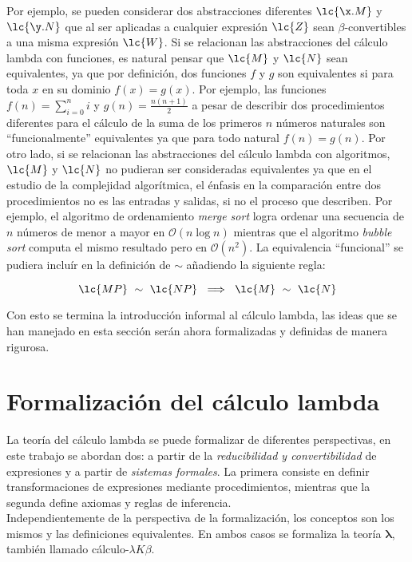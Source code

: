 Por ejemplo, se pueden considerar dos abstracciones diferentes \(\lc{\x.M}\) y
\(\lc{\y.N}\) que al ser aplicadas a cualquier expresión \(\lc{Z}\) sean
\(\beta\)-convertibles a una misma expresión \(\lc{W}\). Si se relacionan las
abstracciones del cálculo lambda con funciones, es natural pensar que \(\lc{M}\)
y \(\lc{N}\) sean equivalentes, ya que por definición, dos funciones \(f\) y
\(g\) son equivalentes si para toda \(x\) en su dominio \(f(x)=g(x)\). Por
ejemplo, las funciones \(f(n)=\sum_{i=0}^{n}i\) y \(g(n)=\frac{n(n+1)}{2}\) a
pesar de describir dos procedimientos diferentes para el cálculo de la suma de
los primeros \(n\) números naturales son ``funcionalmente'' equivalentes ya que
para todo natural \(f(n)=g(n)\). Por otro lado, si se relacionan las
abstracciones del cálculo lambda con algoritmos, \(\lc{M}\) y \(\lc{N}\) no
pudieran ser consideradas equivalentes ya que en el estudio de la complejidad
algorítmica, el énfasis en la comparación entre dos procedimientos no es las
entradas y salidas, si no el proceso que describen. Por ejemplo, el algoritmo de
ordenamiento \emph{merge sort} logra ordenar una secuencia de \(n\) números de
menor a mayor en \(\mathcal{O}(n \log n)\) mientras que el algoritmo
\emph{bubble sort} computa el mismo resultado pero en \(\mathcal{O}(n^2)\).
La equivalencia ``funcional'' se pudiera incluír en la definición de \(\sim\)
añadiendo la siguiente regla:

\[\lc{M P}\ \sim\ \lc{N P}\ \implies\ \lc{M}\ \sim\ \lc{N}\]

Con esto se termina la introducción informal al cálculo lambda, las ideas que se
han manejado en esta sección serán ahora formalizadas y definidas de manera
rigurosa. \\

\section{Formalización del cálculo lambda}

La teoría del cálculo lambda se puede formalizar de diferentes perspectivas, en
este trabajo se abordan dos: a partir de la \emph{reducibilidad y
convertibilidad} de expresiones y a partir de \emph{sistemas formales}. La
primera consiste en definir transformaciones de expresiones mediante
procedimientos, mientras que la segunda define axiomas y reglas de inferencia.
\\

Independientemente de la perspectiva de la formalización, los conceptos son los
mismos y las definiciones equivalentes. En ambos casos se formaliza la teoría
\(\boldsymbol{\lambda}\), también llamado cálculo-\(\lambda K \beta\). \\

